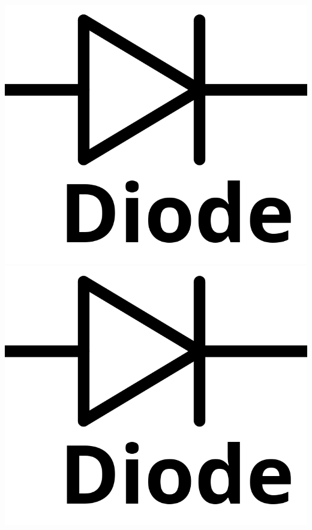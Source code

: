 \documentclass{scrartcl}
\begin{document}
{\begin{minipage}{\textwidth}
			\includegraphics[scale=0.09]{Diode.png}\hspace{0.3cm}
			\includegraphics[scale=0.09]{Diode.png}\hspace{0.3cm}

\end{minipage}}
\end{document}
